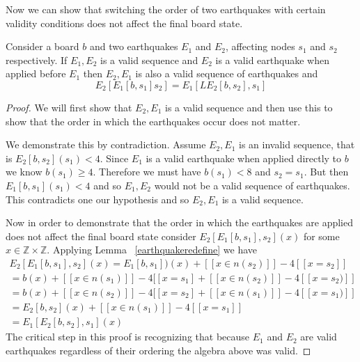 \documentclass[runningheads,a4paper]{llncs}
\begin{document}
Now we can show that switching the order of two earthquakes with certain validity conditions does not affect the final board state.
\begin{lemma}
\label{swappinglemma}
Consider a board $b$ and two earthquakes $E_1$ and $E_2$, affecting nodes $s_1$ and $s_2$ respectively. If $E_1, E_2$ is a valid sequence and $E_2$ is a valid earthquake when applied before $E_1$ then $E_2, E_1$ is also a valid sequence of earthquakes and 
\begin{equation*}
E_2[E_1[b, s_1] s_2] = E_1[LE_2[b, s_2], s_1] 
\end{equation*}
\end{lemma}
\begin{proof}
We will first show that $E_2, E_1$ is a valid sequence and then use this to show that the order in which the earthquakes occur does not matter. 

We demonstrate this by contradiction. Assume  $E_2, E_1$ is an invalid sequence, that is $E_2[b, s_2](s_1)<4$. Since $E_1$ is a valid earthquake when applied directly to $b$ we know $b(s_1) \geq 4 $. 
Therefore we must have $b(s_1)<8$ and $s_2=s_1$. But then $E_1[b, s_1](s_1)<4$ and so $E_1, E_2$ would not be a valid sequence of earthquakes. This contradicts one our hypothesis and so $E_2, E_1$ is a valid sequence. 

Now in order to demonstrate that the order in which the earthquakes are applied does not affect the final board state consider $E_2[ E_1[b, s_1], s_2](x)$ for some $x \in \mathbb{Z} \times \mathbb{Z}$. Applying Lemma ~\ref{earthquakeredefine} we have 
\begin{align*}
E_2[E_1[b, s_1], s_2](x) = E_1[b, s_1])(x)  + [[ x \in n(s_2) ]] - 4[[ x=s_2]] \\
= b(x) + [[ x \in n(s_1) ]] - 4[[x = s_1] + [[ x \in n(s_2) ]] - 4[[ x= s_2)]]  \\
= b(x) + [[ x \in n(s_2) ]] - 4[[x = s_2] + [[ x \in n(s_1) ]] - 4[[ x= s_1)]]\\
= E_2[b, s_2](x) + [[ x \in n(s_1) ]] - 4[[ x = s_1]] \\
= E_1[E_2 [b, s_2], s_1](x) 
\end{align*}
The critical step in this proof is recognizing that because $E_1$ and $E_2$ are valid earthquakes regardless of their ordering the algebra above was valid.
\end{proof}
\end{document}
